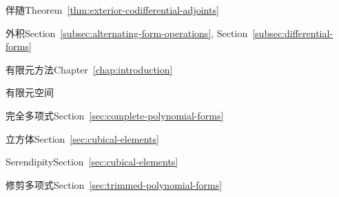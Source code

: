\par\noindent\hspace*{1em}\label{index:exterior-derivative-adjoint-of}{伴随}\quad Theorem~\ref{thm:exterior-codifferential-adjoints}

\par\noindent\hspace*{0em}\label{index:exterior-product}{外积}\quad Section~\ref{subsec:alternating-form-operations}, Section~\ref{subsec:differential-forms}

\par\noindent\hspace*{0em}\label{index:finite-element-method}{有限元方法}\quad Chapter~\ref{chap:introduction}

\par\noindent\hspace*{0em}\label{index:finite-element-space}{有限元空间}

\par\noindent\hspace*{1em}\label{index:finite-element-space-complete-polynomial}{完全多项式}\quad Section~\ref{sec:complete-polynomial-forms}

\par\noindent\hspace*{1em}\label{index:finite-element-space-cubical}{立方体}\quad Section~\ref{sec:cubical-elements}

\par\noindent\hspace*{1em}\label{index:finite-element-space-serendipity}{Serendipity}\quad Section~\ref{sec:cubical-elements}

\par\noindent\hspace*{1em}\label{index:finite-element-space-trimmed-polynomial}{修剪多项式}\quad Section~\ref{sec:trimmed-polynomial-forms}

